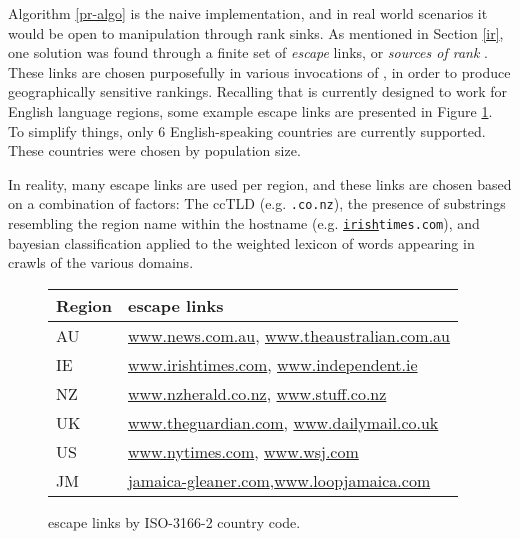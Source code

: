 Algorithm \ref{pr-algo} is the naive implementation, and in real world
scenarios it would be open to manipulation through rank sinks.
As mentioned in Section \ref{ir}, one solution was found through a finite
set of {\it escape} links, or {\it sources of rank} \cite{page1999}.
These links are chosen purposefully in various invocations of \pr{},
in order to produce geographically sensitive rankings.  Recalling that
\nr{} is currently designed to work for English language regions, some
example escape links are presented in Figure \ref{escape}.  To simplify
things, only 6 English-speaking countries are currently supported.  These
countries were chosen by population size.

In reality, many escape links are used per region, and
these links are chosen based on a combination of factors: The ccTLD
(e.g. {\tt .co.nz}),
the presence of substrings resembling the region name within the
hostname (e.g. {\tt \underline{irish}times.com}), and bayesian
classification applied to the weighted lexicon of words appearing in
crawls of the various domains.

\begin{figure}
    \centering
    \begin{tabular}{l|l}
        Region & \pr{} escape links\\
        \hline
        AU & \url{www.news.com.au}, \url{www.theaustralian.com.au}\\
        IE & \url{www.irishtimes.com}, \url{www.independent.ie}\\
        NZ & \url{www.nzherald.co.nz}, \url{www.stuff.co.nz}\\
        UK & \url{www.theguardian.com}, \url{www.dailymail.co.uk}\\
        US & \url{www.nytimes.com}, \url{www.wsj.com}\\
        JM & \href{http://jamaica-gleaner.com}{\url{jamaica-gleaner.com}},\url{www.loopjamaica.com}
    \end{tabular}
    \caption{\pr{} escape links by ISO-3166-2 country code.\label{escape}}
\end{figure}

